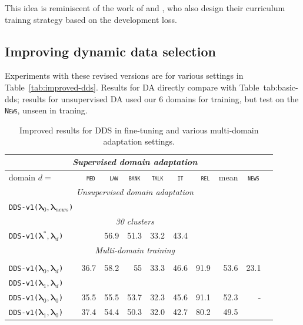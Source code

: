 \documentclass[11pt,a4paper]{article}
\newcommand{\domain}[1]{\texttt{\textsc{#1}}}
\newcommand{\system}[1]{\texttt{{#1}}}
\newcommand{\vlambda}{\ensuremath{\boldsymbol\lambda}\xspace} %
\begin{document}
This idea is reminiscent of the work of \citet{alex17automated} and  \citet{Kumar19reinforcement}, who also design their curriculum trainng strategy based on the development loss.

\subsection{Improving dynamic data selection}
Experiments with these revised versions are for various settings in Table~\ref{tab:improved-dds}. Results for DA directly compare with Table~{tab:basic-dds}; results for unsupervised DA used our 6 domains for training, but test on the \domain{News}, unseen in traning.
\begin{table}
  \centering \small
  \begin{tabular}{|l|*9{r|}} \hline
    \multicolumn{9}{|c|}{\sl Supervised domain adaptation} \\ \hline
    domain \hfill $d=$ & \multicolumn{1}{c|}{\domain{ med}} & \multicolumn{1}{c|}{\domain{ law}} & \multicolumn{1}{c|}{\domain{bank}} & \multicolumn{1}{c|}{\domain{talk}} & \multicolumn{1}{c|}{\domain{ it }} & \multicolumn{1}{c|}{\domain{ rel}} & \multicolumn{1}{c|}{mean} & \multicolumn{1}{|c|}{\domain{news}} \\ \hline \hline
    \multicolumn{9}{|c|}{\sl Unsupervised domain adaptation} \\ \hline
    \system{DDS-v1($\vlambda_0, \vlambda_{news}$)} & \\  \hline\hline 
    \multicolumn{9}{|c|}{\sl 30 clusters} \\ \hline
    \system{DDS-v1($\vlambda^*, \vlambda_d$)}& &56.9&51.3&33.2&43.4&&&
    \\  \hline\hline 
    \multicolumn{9}{|c|}{\sl Multi-domain training} \\ \hline
    \\
    \system{DDS-v1($\vlambda_0, \vlambda_d$)} &36.7&58.2&55&33.3&46.6&91.9&53.6& 23.1 \\
    \system{DDS-v1($\vlambda_1, \vlambda_d$)} & \\
    \system{DDS-v1($\vlambda_0, \vlambda_0$)}&35.5&55.5&53.7&32.3&45.6&91.1&52.3& - \\
    \system{DDS-v1($\vlambda_1, \vlambda_0$)}&37.4&54.4&50.3&32.0&42.7&80.2&49.5 \\ \hline
  \end{tabular}
  \caption{Improved results for DDS in fine-tuning and various multi-domain adaptation settings.}
  \label{tab:basic-dds}
\end{table}
\end{document}
